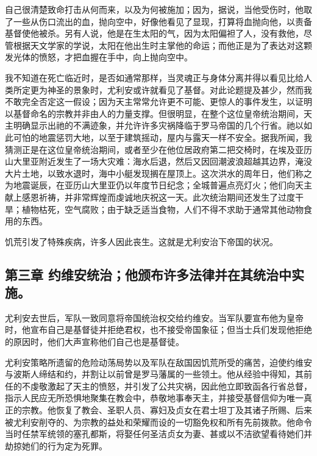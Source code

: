 自己很清楚致命打击从何而来，以及为何被施加；因为，据说，当他受伤时，他取了一些从伤口流出的血，抛向空中，好像他看见了显现，打算将血抛向他，以责备基督使他被杀。另有人说，他是在生太阳的气，因为太阳偏袒了人，没有救他，尽管根据天文学家的学说，太阳在他出生时主掌他的命运；而他正是为了表达对这颗发光体的愤怒，才把血握在手中，向上抛向空中。\par

我不知道在死亡临近时，是否如通常那样，当灵魂正与身体分离并得以看见比给人类所定更为神圣的景象时，尤利安或许就看见了基督。对此论题提及甚少，然而我不敢完全否定这一假设；因为天主常常允许更不可能、更惊人的事件发生，以证明以基督命名的宗教并非由人的力量支撑。但很明显，在整个这位皇帝统治期间，天主明确显示出祂的不满迹象，并允许许多灾祸降临于罗马帝国的几个行省。祂以如此可怕的地震惩罚大地，以至于建筑摇动，屋内与露天一样不安全。据我所闻，我猜测正是在这位皇帝统治期间，或者至少在他位居政府第二把交椅时，在埃及亚历山大里亚附近发生了一场大灾难：海水后退，然后又因回潮波浪超越其边界，淹没大片土地，以致水退时，海中小艇发现搁在屋顶上。这次洪水的周年日，他们称之为地震诞辰，在亚历山大里亚仍以年度节日纪念；全城普遍点亮灯火；他们向天主献上感恩祈祷，并非常辉煌而虔诚地庆祝这一天。此次统治期间还发生了过度干旱；植物枯死，空气腐败；由于缺乏适当食物，人们不得不求助于通常其他动物食用的东西。\par

饥荒引发了特殊疾病，许多人因此丧生。这就是尤利安治下帝国的状况。\par


\subsection{第三章 约维安统治；他颁布许多法律并在其统治中实施。}

尤利安去世后，军队一致同意将帝国统治权交给约维安。当军队要宣布他为皇帝时，他宣布自己是基督徒并拒绝君权，也不接受帝国象征；但当士兵们发现他拒绝的原因时，他们大声宣称他们自己也是基督徒。\par

尤利安策略所遗留的危险动荡局势以及军队在敌国因饥荒所受的痛苦，迫使约维安与波斯人缔结和约，并割让以前曾是罗马藩属的一些领土。他从经验中得知，其前任的不虔敬激起了天主的愤怒，并引发了公共灾祸，因此他立即致函各行省总督，指示人民应无所恐惧地聚集在教会中，恭敬地事奉天主，并接受基督信仰为唯一真正的宗教。他恢复了教会、圣职人员、寡妇及贞女在君士坦丁及其诸子所赐、后来被尤利安削夺的、为宗教的益处和荣耀而设的一切豁免权和所有先前拨款。他命令当时任禁军统领的塞孔都斯，将娶任何圣洁贞女为妻、甚或以不洁欲望看待她们并劫掠她们的行为定为死罪。\par

